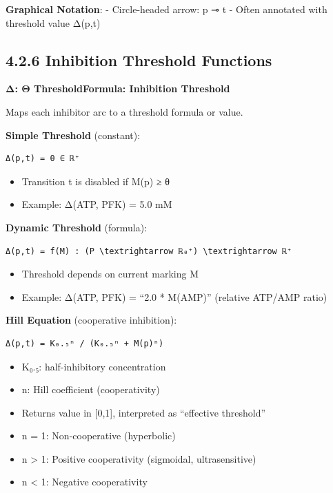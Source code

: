 \textbf{Graphical Notation}: - Circle-headed arrow: p ⊸ t - Often
annotated with threshold value Δ(p,t)

\hypertarget{inhibition-threshold-functions}{%
\subsection{4.2.6 Inhibition Threshold
Functions}\label{inhibition-threshold-functions}}

\textbf{Δ: Θ \textrightarrow ThresholdFormula: Inhibition Threshold}

Maps each inhibitor arc to a threshold formula or value.

\textbf{Simple Threshold} (constant):

\begin{lstlisting}
Δ(p,t) = θ ∈ ℝ⁺
\end{lstlisting}

\begin{itemize}
\tightlist
\item
  Transition t is disabled if M(p) ≥ θ
\item
  Example: Δ(ATP, PFK) = 5.0 mM
\end{itemize}

\textbf{Dynamic Threshold} (formula):

\begin{lstlisting}
Δ(p,t) = f(M) : (P \textrightarrow ℝ₀⁺) \textrightarrow ℝ⁺
\end{lstlisting}

\begin{itemize}
\tightlist
\item
  Threshold depends on current marking M
\item
  Example: Δ(ATP, PFK) = ``2.0 * M(AMP)'' (relative ATP/AMP ratio)
\end{itemize}

\textbf{Hill Equation} (cooperative inhibition):

\begin{lstlisting}
Δ(p,t) = K₀.₅ⁿ / (K₀.₅ⁿ + M(p)ⁿ)
\end{lstlisting}

\begin{itemize}
\tightlist
\item
  K₀.₅: half-inhibitory concentration
\item
  n: Hill coefficient (cooperativity)
\item
  Returns value in {[}0,1{]}, interpreted as ``effective threshold''
\item
  n = 1: Non-cooperative (hyperbolic)
\item
  n \textgreater{} 1: Positive cooperativity (sigmoidal, ultrasensitive)
\item
  n \textless{} 1: Negative cooperativity
\end{itemize}

